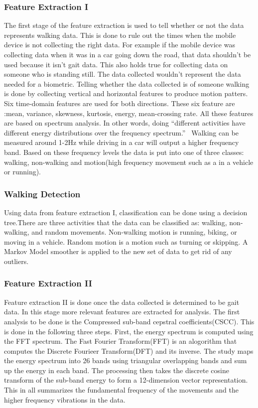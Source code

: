 \documentclass{sig-alternate}
\begin{document}
\subsubsection{Feature Extraction I}
	The first stage of the feature extraction is used to tell whether or not the data represents walking data. This is done to rule out the times when the mobile device is not collecting the right data. For example if the mobile device was collecting data when it was in a car going down the road, that data shouldn't be used because it isn't gait data. This also holds true for collecting data on someone who is standing still. The data collected wouldn't represent the data needed for a biometric. Telling whether the data collected is of someone walking is done by collecting vertical and horizontal features to produce motion patters. Six time-domain features are used for both directions. These six feature are :mean, variance, skewness, kurtosis, energy, mean-crossing rate. All these features are based on spectrum analysis. In other words, doing ``different activities have different energy distributions over the frequency spectrum.''~\cite{Lu:2014} Walking can be measured around 1-2Hz while driving in a car will output a higher frequency band. Based on these frequency levels the data is put into one of three classes: walking, non-walking and motion(high frequency movement such as a in a vehicle or running).~\cite{Muaaz:2013}
\subsubsection{Walking Detection}
	Using data from feature extraction I, classification can be done using a decision tree.There are three activities that the data can be classified as: walking, non-walking, and random movements. Non-walking motion is running, biking, or moving in a vehicle. Random motion is a motion such as turning or skipping. A Markov Model smoother is applied to the new set of data to get rid of any outliers. 
\subsubsection{Feature Extraction II}{
	Feature extraction II is done once the data collected is determined to be gait data. In this stage more relevant features are extracted for analysis. The first analysis to be done is the Compressed sub-band cepstral coefficients(CSCC). This is done in the following three steps. First, the energy spectrum is computed using the FFT spectrum. The Fast Fourier Transform(FFT) is an alogorithm that computes the Discrete Fourieer Transform(DFT) and its inverse. The study maps the energy spectrum into 26 bands using triangular overlapping bands and sum up the energy in each band. The processing then takes the discrete cosine transform of the sub-band energy to form a 12-dimension vector representation. This in all summarizes the fundamental frequency of the movements and the higher frequency vibrations in the data.~\cite{Sujithra:2012}
}
\end{document}
